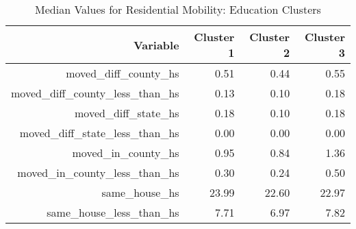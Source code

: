 \begin{table}[ht]
    \centering
    \caption{Median Values for Residential Mobility: Education Clusters}
    \label{tab:trans_edu}
    \begin{tabular}{|r|r|r|r|}
      \hline
     Variable & Cluster 1 & Cluster 2 & Cluster 3 \\ 
      \hline
    moved\_diff\_county\_hs & 0.51 & 0.44 & 0.55 \\ 
    \hline
      moved\_diff\_county\_less\_than\_hs & 0.13 & 0.10 & 0.18 \\ 
      \hline
      moved\_diff\_state\_hs & 0.18 & 0.10 & 0.18 \\
      \hline 
      moved\_diff\_state\_less\_than\_hs & 0.00 & 0.00 & 0.00 \\
      \hline 
      moved\_in\_county\_hs & 0.95 & 0.84 & 1.36 \\ 
      \hline
      moved\_in\_county\_less\_than\_hs & 0.30 & 0.24 & 0.50 \\ 
      \hline
      same\_house\_hs & 23.99 & 22.60 & 22.97 \\ 
      \hline
      same\_house\_less\_than\_hs & 7.71 & 6.97 & 7.82 \\ 
       \hline
    \end{tabular}
    \end{table}